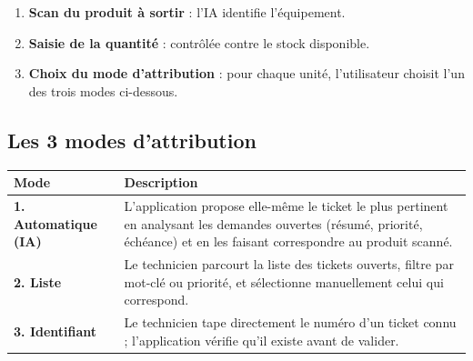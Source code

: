 \documentclass[11pt,a4paper]{article}
\begin{document}
\begin{enumerate}
  \item \textbf{Scan du produit à sortir} : l'IA identifie l'équipement.
  \item \textbf{Saisie de la quantité} : contrôlée contre le stock disponible.
  \item \textbf{Choix du mode d'attribution} : pour chaque unité,
        l'utilisateur choisit l'un des trois modes ci-dessous.
\end{enumerate}

\vspace{4pt}
\begin{center}
\end{center}

\subsection{Les 3 modes d'attribution}

\begin{center}
\begin{tabularx}{\linewidth}{@{}lX@{}}
\toprule
\textbf{Mode}            & \textbf{Description}\\
\midrule
\textbf{1. Automatique (IA)} & L'application propose elle-même le
    ticket le plus pertinent en analysant les demandes ouvertes
    (résumé, priorité, échéance) et en les faisant correspondre au
    produit scanné.\\
\addlinespace
\textbf{2. Liste}            & Le technicien parcourt la liste des
    tickets ouverts, filtre par mot-clé ou priorité, et sélectionne
    manuellement celui qui correspond.\\
\addlinespace
\textbf{3. Identifiant}      & Le technicien tape directement le
    numéro d'un ticket connu ; l'application vérifie qu'il existe
    avant de valider.\\
\bottomrule
\end{tabularx}
\end{center}
\end{document}
